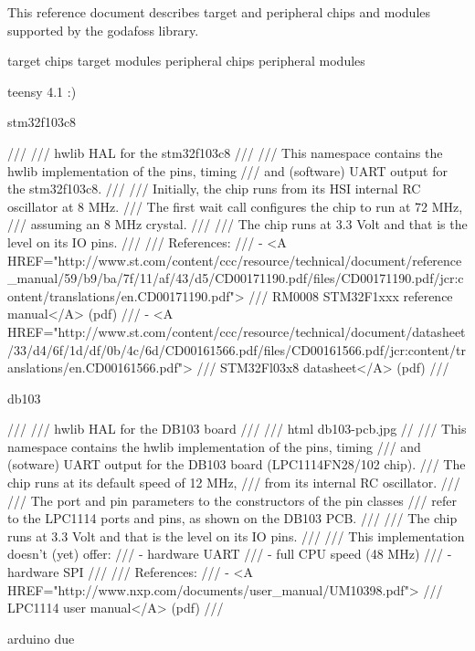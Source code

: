 This reference document describes target and peripheral chips and modules
supported by the godafoss library.


target chips
target modules
peripheral chips
peripheral modules

teensy 4.1 :)

stm32f103c8


/// \brief
/// hwlib HAL for the stm32f103c8
///
/// This namespace contains the hwlib implementation of the pins, timing
/// and (software) UART output for the stm32f103c8.
///
/// Initially, the chip runs from its HSI internal RC oscillator at 8 MHz.
/// The first wait call configures the chip to run at 72 MHz,
/// assuming an 8 MHz crystal.
///
/// The chip runs at 3.3 Volt and that is the level on its IO pins.
///
/// References:
///    - <A HREF="http://www.st.com/content/ccc/resource/technical/document/reference_manual/59/b9/ba/7f/11/af/43/d5/CD00171190.pdf/files/CD00171190.pdf/jcr:content/translations/en.CD00171190.pdf">
///       RM0008 STM32F1xxx reference manual</A> (pdf)
///    - <A HREF="http://www.st.com/content/ccc/resource/technical/document/datasheet/33/d4/6f/1d/df/0b/4c/6d/CD00161566.pdf/files/CD00161566.pdf/jcr:content/translations/en.CD00161566.pdf">
///       STM32Fl03x8 datasheet</A> (pdf)
///

db103

/// \brief
/// hwlib HAL for the DB103 board
///
/// \image html db103-pcb.jpg
//
/// This namespace contains the hwlib implementation of the pins, timing
/// and (sotware) UART output for the DB103 board (LPC1114FN28/102 chip).
/// The chip runs at its default speed of 12 MHz,
/// from its internal RC oscillator.
///
/// The port and pin parameters to the constructors of the pin classes
/// refer to the LPC1114 ports and pins, as shown on the DB103 PCB.
///
/// The chip runs at 3.3 Volt and that is the level on its IO pins.
///
/// This implementation doesn't (yet) offer:
///    - hardware UART
///    - full CPU speed (48 MHz)
///    - hardware SPI
///
/// References:
///    - <A HREF="http://www.nxp.com/documents/user_manual/UM10398.pdf">
///       LPC1114 user manual</A> (pdf)
///

arduino due

